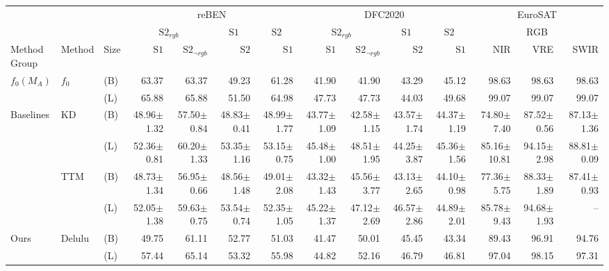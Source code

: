 \begin{tabular}{lll | r r r r | r r r r | r r r}
\toprule
  \multicolumn{3}{c}{} & \multicolumn{4}{c|}{reBEN} & \multicolumn{4}{c|}{DFC2020} & \multicolumn{3}{c}{EuroSAT} \\
  \multicolumn{3}{c}{} & \multicolumn{2}{c}{$\mathrm{S2}_{rgb}$} & \multicolumn{1}{c}{$\mathrm{S1}$} & \multicolumn{1}{c|}{$\mathrm{S2}$} & \multicolumn{2}{c}{$\mathrm{S2}_{rgb}$} & \multicolumn{1}{c}{$\mathrm{S1}$} & \multicolumn{1}{c|}{$\mathrm{S2}$} & \multicolumn{3}{c}{RGB} \\
  \shortstack[c]{Method\\Group} & Method & Size & $\mathrm{S1}$ & $\mathrm{S2}_{\neg rgb}$ & $\mathrm{S2}$ & $\mathrm{S1}$ & $\mathrm{S1}$ & $\mathrm{S2}_{\neg rgb}$ & $\mathrm{S2}$ & $\mathrm{S1}$ & NIR & VRE & SWIR \\
  \midrule
  \multirow{2}{*}{$f_0(M_A)$} & \multirow{2}{*}{$f_0$} & (B) & 63.37 & 63.37 & 49.23 & 61.28 & 41.90 & 41.90 & 43.29 & 45.12 & 98.63 & 98.63 & 98.63 \\
   &  & (L) & 65.88 & 65.88 & 51.50 & 64.98 & 47.73 & 47.73 & 44.03 & 49.68 & 99.07 & 99.07 & 99.07 \\
  \midrule
  \multirow{4}{*}{Baselines} & \multirow{2}{*}{KD} & (B) & 48.96$\pm$1.32 & 57.50$\pm$0.84 & 48.83$\pm$0.41 & 48.99$\pm$1.77 & 43.77$\pm$1.09 & 42.58$\pm$1.15 & 43.57$\pm$1.74 & 44.37$\pm$1.19 & 74.80$\pm$7.40 & 87.52$\pm$0.56 & 87.13$\pm$1.36 \\
   &  & (L) & 52.36$\pm$0.81 & 60.20$\pm$1.33 & 53.35$\pm$1.16 & 53.15$\pm$0.75 & 45.48$\pm$1.00 & 48.51$\pm$1.95 & 44.25$\pm$3.87 & 45.36$\pm$1.56 & 85.16$\pm$10.81 & 94.15$\pm$2.98 & 88.81$\pm$0.09 \\
   & \multirow{2}{*}{TTM} & (B) & 48.73$\pm$1.34 & 56.95$\pm$0.66 & 48.56$\pm$1.48 & 49.01$\pm$2.08 & 43.32$\pm$1.43 & 45.56$\pm$3.77 & 43.13$\pm$2.65 & 44.10$\pm$0.98 & 77.36$\pm$5.75 & 88.33$\pm$1.89 & 87.41$\pm$0.93 \\
   &  & (L) & 52.05$\pm$1.38 & 59.63$\pm$0.75 & 53.54$\pm$0.74 & 52.35$\pm$1.05 & 45.22$\pm$1.37 & 47.12$\pm$2.69 & 46.57$\pm$2.86 & 44.89$\pm$2.01 & 85.78$\pm$9.43 & 94.68$\pm$1.93 & -- \\
  \midrule
  \multirow{2}{*}{Ours} & \multirow{2}{*}{Delulu} & (B) & 49.75 & 61.11 & 52.77 & 51.03 & 41.47 & 50.01 & 45.45 & 43.34 & 89.43 & 96.91 & 94.76 \\
   &  & (L) & 57.44 & 65.14 & 53.32 & 55.98 & 44.82 & 52.16 & 46.79 & 46.81 & 97.04 & 98.15 & 97.31 \\

\end{tabular}
